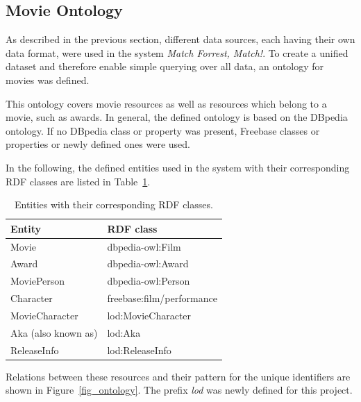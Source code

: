 \subsection{Movie Ontology}
\label{subsec_method_ontology}

As described in the previous section, different data sources, each having their own data format, were used in the system \emph{Match Forrest, Match!}.
To create a unified dataset and therefore enable simple querying over all data, an ontology for movies was defined.

This ontology covers movie resources as well as resources which belong to a movie, such as awards.
In general, the defined ontology is based on the DBpedia ontology.
If no DBpedia class or property was present, Freebase classes or properties or newly defined ones were used.

In the following, the defined entities used in the system with their corresponding RDF classes are listed in Table~\ref{tab_entities}.

\begin{table}[ht]
	\begin{center}
	\begin{tabular}{ll}
		\textbf{Entity} & \textbf{RDF class} \\ \hline
		Movie & dbpedia-owl:Film \\
		Award & dbpedia-owl:Award \\
		MoviePerson & dbpedia-owl:Person \\
		Character & freebase:film/performance \\
		MovieCharacter & lod:MovieCharacter \\
		Aka (also known as) & lod:Aka \\
		ReleaseInfo & lod:ReleaseInfo \\
	\end{tabular}
	\end{center}
	\caption{Entities with their corresponding RDF classes.}
	\label{tab_entities}
\end{table}

Relations between these resources and their pattern for the unique identifiers are shown in Figure~\ref{fig_ontology}.
The prefix \textit{lod} was newly defined for this project.

